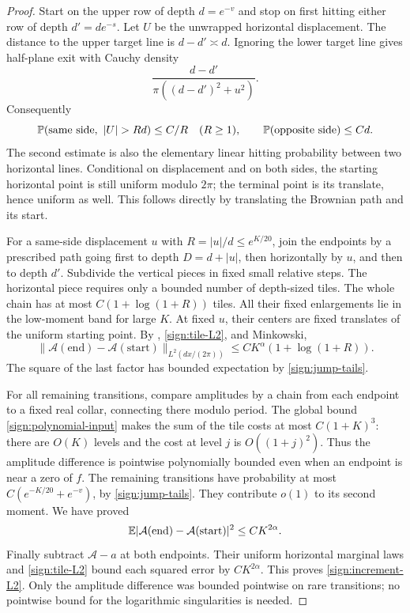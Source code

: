 \begin{proof}
Start on the upper row of depth \(d=e^{-v}\) and stop on first
hitting either row of depth \(d'=de^{-s}\).  Let \(U\) be the
unwrapped horizontal displacement.  The distance to the upper target
line is \(d-d'\asymp d\).  Ignoring the lower target line gives
half-plane exit with Cauchy density
\[
 \frac{d-d'}{\pi((d-d')^2+u^2)}.
\]
Consequently
\begin{equation}\label{sign:jump-tails}
 \Prob(\text{same side},\ |U|>Rd)\le C/R\quad(R\ge1),
 \qquad \Prob(\text{opposite side})\le Cd.
\end{equation}
The second estimate is also the elementary linear hitting probability
between two horizontal lines.  Conditional on displacement and on
both sides, the starting horizontal point is still uniform modulo
\(2\pi\); the terminal point is its translate, hence uniform as well.
This follows directly by translating the Brownian path and its start.

For a same-side displacement \(u\) with \(R=|u|/d\le e^{K/20}\),
join the endpoints by a prescribed path going first to depth
\(D=d+|u|\), then horizontally by \(u\), and then to depth \(d'\).
Subdivide the vertical pieces in fixed small relative steps.  The
horizontal piece requires only a bounded number of depth-sized tiles.
The whole chain has at most \(C(1+\log(1+R))\) tiles.  All their fixed
enlargements lie in the low-moment band for large \(K\).  At fixed
\(u\), their centers are fixed translates of the uniform starting
point.  By , \eqref{sign:tile-L2}, and Minkowski,
\[
 \|\mathcal A(\text{end})-\mathcal A(\text{start})\|_{L^2(dx/(2\pi))}
 \le CK^\alpha(1+\log(1+R)).
\]
The square of the last factor has bounded expectation by
\eqref{sign:jump-tails}.

For all remaining transitions, compare amplitudes by a chain from
each endpoint to a fixed real collar, connecting there modulo period.
The global bound \eqref{sign:polynomial-input} makes the sum of the
tile costs at most \(C(1+K)^3\): there are \(O(K)\) levels and the
cost at level \(j\) is \(O((1+j)^2)\).  Thus the amplitude difference
is pointwise polynomially bounded even when an endpoint is near a
zero of \(f\).  The remaining transitions have probability at most
\(C(e^{-K/20}+e^{-v})\), by \eqref{sign:jump-tails}.  They contribute
\(o(1)\) to its second moment.  We have proved
\[
 \mathbb E|\mathcal A(\text{end})-\mathcal A(\text{start})|^2
       \le CK^{2\alpha}.
\]
Finally subtract \(\mathcal A-a\) at both endpoints.  Their uniform
horizontal marginal laws and \eqref{sign:tile-L2} bound each squared
error by \(CK^{2\alpha}\).  This proves
\eqref{sign:increment-L2}.  Only the amplitude difference was bounded
pointwise on rare transitions; no pointwise bound for the logarithmic
singularities is needed.
\end{proof}
